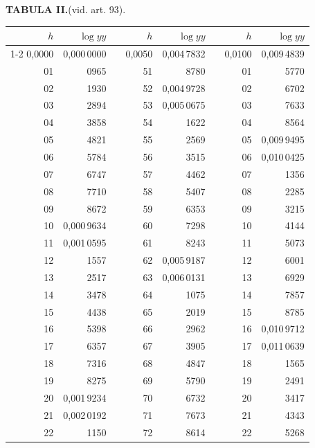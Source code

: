 \clearpage
{}
\begingroup
\centering
\fontsize{9}{9}\selectfont
\setlength{\tabcolsep}{8pt}
\renewcommand{\arraystretch}{1}
\setlength{\parskip}{0pt}
\textbf{TABULA II.}\quad (vid. art. 93).
\par\vspace{7pt}
\begin{tabular}{|r|r|@{}p{9pt}@{}|r|r|@{}p{9pt}@{}|r|r|}
\hline
\(h\) & \(\log yy\) & & \(h\) & \(\log yy\) & & \(h\) & \(\log yy\) \\
\cline{1-2}\cline{4-5}\cline{7-8}
0,0000 & 0,000\,0000 &  & 0,0050 & 0,004\,7832 &  & 0,0100 & 0,009\,4839 \\
01 & 0965 &  & 51 & 8780 &  & 01 & 5770 \\
02 & 1930 &  & 52 & 0,004\,9728 &  & 02 & 6702 \\
03 & 2894 &  & 53 & 0,005\,0675 &  & 03 & 7633 \\
04 & 3858 &  & 54 & 1622 &  & 04 & 8564 \\
05 & 4821 &  & 55 & 2569 &  & 05 & 0,009\,9495 \\[3pt]
06 & 5784 &  & 56 & 3515 &  & 06 & 0,010\,0425 \\
07 & 6747 &  & 57 & 4462 &  & 07 & 1356 \\
08 & 7710 &  & 58 & 5407 &  & 08 & 2285 \\
09 & 8672 &  & 59 & 6353 &  & 09 & 3215 \\
10 & 0,000\,9634 &  & 60 & 7298 &  & 10 & 4144 \\[3pt]
11 & 0,001\,0595 &  & 61 & 8243 &  & 11 & 5073 \\
12 & 1557 &  & 62 & 0,005\,9187 &  & 12 & 6001 \\
13 & 2517 &  & 63 & 0,006\,0131 &  & 13 & 6929 \\
14 & 3478 &  & 64 & 1075 &  & 14 & 7857 \\
15 & 4438 &  & 65 & 2019 &  & 15 & 8785 \\[3pt]
16 & 5398 &  & 66 & 2962 &  & 16 & 0,010\,9712 \\
17 & 6357 &  & 67 & 3905 &  & 17 & 0,011\,0639 \\
18 & 7316 &  & 68 & 4847 &  & 18 & 1565 \\
19 & 8275 &  & 69 & 5790 &  & 19 & 2491 \\
20 & 0,001\,9234 &  & 70 & 6732 &  & 20 & 3417 \\[3pt]
21 & 0,002\,0192 &  & 71 & 7673 &  & 21 & 4343 \\
22 & 1150 &  & 72 & 8614 &  & 22 & 5268 \\

\end{tabular}
